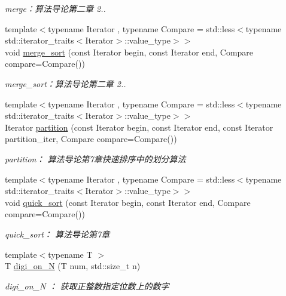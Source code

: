 \begin{DoxyCompactItemize}
\begin{DoxyCompactList}\small\item\em merge：算法导论第二章 2.. \end{DoxyCompactList}\item 
{\footnotesize template$<$typename Iterator , typename Compare  = std\+::less$<$typename std\+::iterator\+\_\+traits$<$\+Iterator$>$\+::value\+\_\+type$>$$>$ }\\void \hyperlink{namespace_introdunction_to_algorithm_1_1_sort_algorithm_ab72ad89c389207e4b58443f9f57119af}{merge\+\_\+sort} (const Iterator begin, const Iterator end, Compare compare=Compare())
\begin{DoxyCompactList}\small\item\em merge\+\_\+sort：算法导论第二章 2.. \end{DoxyCompactList}\item 
{\footnotesize template$<$typename Iterator , typename Compare  = std\+::less$<$typename std\+::iterator\+\_\+traits$<$\+Iterator$>$\+::value\+\_\+type$>$$>$ }\\Iterator \hyperlink{namespace_introdunction_to_algorithm_1_1_sort_algorithm_ab8cd83d08fe92b89e749c3fcef28ae55}{partition} (const Iterator begin, const Iterator end, const Iterator partition\+\_\+iter, Compare compare=Compare())
\begin{DoxyCompactList}\small\item\em partition： 算法导论第7章快速排序中的划分算法 \end{DoxyCompactList}\item 
{\footnotesize template$<$typename Iterator , typename Compare  = std\+::less$<$typename std\+::iterator\+\_\+traits$<$\+Iterator$>$\+::value\+\_\+type$>$$>$ }\\void \hyperlink{namespace_introdunction_to_algorithm_1_1_sort_algorithm_a223dc6a022f56f3de9c9e40e4a0497ff}{quick\+\_\+sort} (const Iterator begin, const Iterator end, Compare compare=Compare())
\begin{DoxyCompactList}\small\item\em quick\+\_\+sort： 算法导论第7章 \end{DoxyCompactList}\item 
{\footnotesize template$<$typename T $>$ }\\T \hyperlink{namespace_introdunction_to_algorithm_1_1_sort_algorithm_a4e56c4fee6bd1c903ef6cfc14719d99c}{digi\+\_\+on\+\_\+\+N} (T num, std\+::size\+\_\+t n)
\begin{DoxyCompactList}\small\item\em digi\+\_\+on\+\_\+\+N ： 获取正整数指定位数上的数字 \end{DoxyCompactList}\item 

\end{DoxyCompactItemize}
